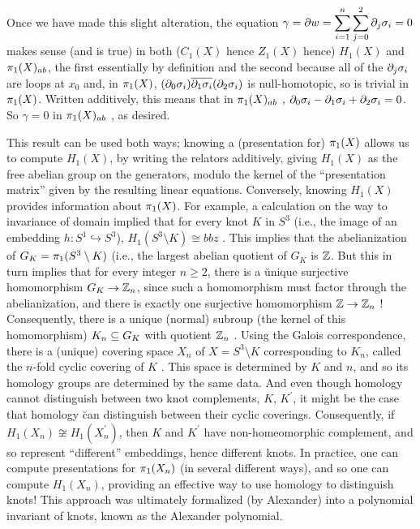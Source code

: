 Once we have made this slight alteration, the equation
$\displaystyle \gamma = \partial w = \sum_{i=1}^n \sum_{j=0}^2 \partial_j \sigma_i = 0$
makes sense (and is true) in both ($C_1(X)$ hence $Z_1(X)$ hence) $H_1(X)$ and
$\pi_1(X)_{ab}$, the first essentially by definition and the second because 
all of the $\partial_j \sigma_i$ are loops at $x_0$ and, in 
$\pi_1(X)$, $(\partial_0\sigma_i)\overline{\partial_1\sigma_i}(\partial_2\sigma_i)$ is null-homotopic,
so is trivial in $\pi_1(X)$. Written additively, this means that in
$\pi_1(X)_{ab}$ , $\partial_0\sigma_i - \partial_1\sigma_i + \partial_2\sigma_i = 0$. 
So $\gamma = 0$ in $\pi_1(X)_{ab}$ , as desired.

\msk

This result can be used both ways; knowing a (presentation for) $\pi_1(X)$
allows us to compute $H_1(X)$, by writing the relators additively, giving
$H_1(X)$ as the free abelian group on the generators, modulo the kernel 
of the ``presentation matrix'' given by the resulting linear equations. Conversely,
knowing $H_1(X)$ provides information about $\pi_1(X)$. For example,
a calculation on the way to invariance of domain implied that for every
knot $K$ in $S^3$ (i.e., the image of an embedding $h:S^1\hookrightarrow S^3$),
$H_1(S^3\setminus K) \cong bbz$ . This implies that the abelianization of 
$G_K = \pi_1(S^3\setminus K)$ (i.e., the largest abelian quotient of $G_K$  is ${\Bbb Z}$.
But this in turn implies that for every integer $n\geq 2$, there is a \u{unique}
surjective homomorphism $G_K\rightarrow {\Bbb Z}_n$, since such a homomorphism must factor 
through the abelianization, and there is exactly one surjective homomorphism
${\Bbb Z} \rightarrow {\Bbb Z}_n$ ! Consequently, there is a unique (normal) subroup (the kernel
of this homomorphism) $K_n\subseteq G_K$ with quotient ${\Bbb Z}_n$ . Using the Galois
correspondence, there is a (unique) covering space $X_n$ of $X=S^3\setminus K$
corresponding to $K_n$, called the $n$-fold cyclic covering of $K$ . This space is determined
by $K$ and $n$, and so its homology groups are determined by the same data.
And even though homology cannot distinguish between two knot complements,
$K$, $K^\prime$, it might be the case that homology \u{can} distinguish between 
their cyclic coverings. Consequently, 
if $H_1(X_n)\not\cong H_1(X_n^\prime)$, then $K$ and $K^\prime$ have non-homeomorphic
complement, and so represent ``different'' embeddings, hence different knots.
In practice, one can compute presentations for $\pi_1(X_n)$ (in several different ways),
and so one can compute $H_1(X_n)$, providing an effective way to use homology
to distinguish knots! This approach was ultimately formalized (by Alexander) into a polynomial
invariant of knots, known as the Alexander polynomial.






